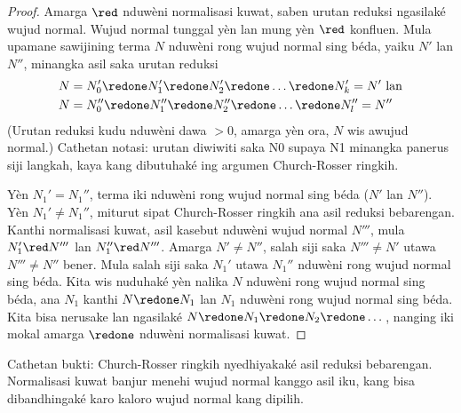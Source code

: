 \documentclass[../../../include/open-logic-section]{subfiles}
\begin{document}
\begin{proof}
  Amarga $\red$ nduwèni normalisasi kuwat, saben urutan reduksi
  ngasilaké wujud normal. Wujud normal tunggal yèn lan mung yèn $\red$
  konfluen. Mula upamane sawijining terma $N$ nduwèni rong wujud normal
  sing béda, yaiku $N'$ lan $N''$, minangka asil saka urutan reduksi
  \begin{align*}
  N & = N_0' \redone N_1' \redone N_2' \redone \dots \redone N_k' = N' \text{ lan}\\
  N & = N_0'' \redone N_1'' \redone N_2'' \redone \dots \redone N_l'' = N''
  \end{align*}
  (Urutan reduksi kudu nduwèni dawa $>0$, amarga yèn ora, $N$ wis
  awujud normal.)
Cathetan notasi: urutan diwiwiti saka N0 supaya N1 minangka panerus siji langkah, kaya kang dibutuhaké ing argumen Church-Rosser ringkih.

  Yèn $N_1' = N_1''$, terma iki nduwèni rong wujud normal sing béda
  ($N'$ lan $N''$). Yèn $N_1' \neq N_1''$, miturut sipat Church-Rosser
  ringkih ana asil reduksi bebarengan. Kanthi normalisasi kuwat, asil
  kasebut nduwèni wujud normal $N'''$, mula $N_1' \red N'''$ lan
  $N_1'' \red N'''$. Amarga $N' \neq N''$, salah siji saka
  $N''' \neq N'$ utawa $N''' \neq N''$ bener. Mula salah siji saka
  $N_1'$ utawa $N_1''$ nduwèni rong wujud normal sing béda. Kita wis
  nuduhaké yèn nalika $N$ nduwèni rong wujud normal sing béda, ana
  $N_1$ kanthi $N \redone N_1$ lan $N_1$ nduwèni rong wujud normal
  sing béda. Kita bisa nerusake lan ngasilaké $N \redone N_1
  \redone N_2 \redone \dots$, nanging iki mokal amarga $\redone$
  nduwèni normalisasi kuwat.
\end{proof}
Cathetan bukti: Church-Rosser ringkih nyedhiyakaké asil reduksi bebarengan. Normalisasi kuwat banjur menehi wujud normal kanggo asil iku, kang bisa dibandhingaké karo kaloro wujud normal kang dipilih.
\end{document}
